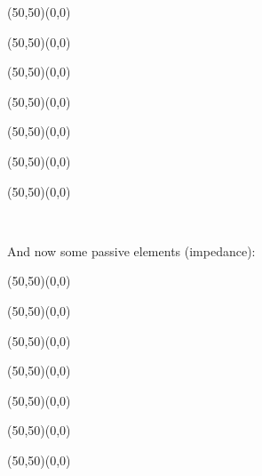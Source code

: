 	\vspace{1cm}
	\begin{center}
	\begin{picture}(50,50)(0,0)
	\end{picture}
	\begin{picture}(50,50)(0,0)
	\end{picture}
	\begin{picture}(50,50)(0,0)
	\end{picture}
	\begin{picture}(50,50)(0,0)
	\end{picture}
	\begin{picture}(50,50)(0,0)
	\end{picture}
	\begin{picture}(50,50)(0,0)
	\end{picture}
	\begin{picture}(50,50)(0,0)
	\end{picture}
	\\[2cm]
	\end{center}
	
	\pagebreak
	And now some passive elements (impedance):
	\vspace{1cm}
	\begin{center}
	\begin{picture}(50,50)(0,0)
	\end{picture}
	\begin{picture}(50,50)(0,0)
	\end{picture}
	\begin{picture}(50,50)(0,0)
	\end{picture}
	\begin{picture}(50,50)(0,0)
	\end{picture}
	\begin{picture}(50,50)(0,0)
	\end{picture}
	\begin{picture}(50,50)(0,0)
	\end{picture}
	\begin{picture}(50,50)(0,0)
	\end{picture}
	\end{center}
	
